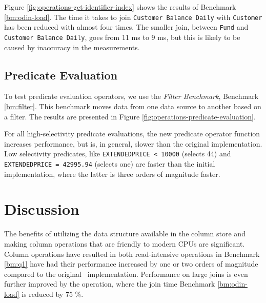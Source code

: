 
Figure \ref{fig:operations-get-identifier-index} shows the results of Benchmark \ref{bm:odin-load}. The time it takes to join \texttt{Customer Balance Daily} with \texttt{Customer} has been reduced with almost four times. The smaller join, between \texttt{Fund} and \texttt{Customer Balance Daily}, goes from 11 ms to 9 ms, but this is likely to be caused by inaccuracy in the measurements.

\subsection{Predicate Evaluation}
\label{sub:Predicate Evaluation}


To test predicate evaluation operators, we use the \textit{Filter Benchmark}, Benchmark \ref{bm:filter}. This benchmark moves data from one data source to another based on a filter. The results are presented in Figure \ref{fig:operations-predicate-evaluation}.

For all high-selectivity predicate evaluations, the new predicate operator function increases performance, but is, in general, slower than the original implementation. Low selectivity predicates, like \texttt{EXTENDEDPRICE < 10000} (selects 44) and \texttt{EXTENDEDPRICE = 42995.94} (selects one) are faster than the initial implementation, where the latter is three orders of magnitude faster.

\section{Discussion}
\label{sec:Discussion}
The benefits of utilizing the data structure available in the column store and making column operations that are friendly to modern CPUs are significant. Column operations have resulted in both read-intensive operations in Benchmark \ref{bm:q1} have had their performance increased by one or two orders of magnitude compared to the original \gap~implementation. Performance on large joins is even further improved by the  operation, where the join time Benchmark \ref{bm:odin-load} is reduced by 75 \%.

